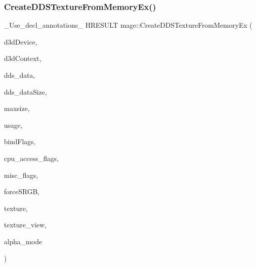 \subsubsection{\texorpdfstring{Create\+D\+D\+S\+Texture\+From\+Memory\+Ex()}{CreateDDSTextureFromMemoryEx()}\hspace{0.1cm}{\footnotesize\ttfamily [4/4]}}
{\footnotesize\ttfamily \+\_\+\+Use\+\_\+decl\+\_\+annotations\+\_\+ H\+R\+E\+S\+U\+LT mage\+::\+Create\+D\+D\+S\+Texture\+From\+Memory\+Ex (\begin{DoxyParamCaption}\item[{I\+D3\+D11\+Device $\ast$}]{d3d\+Device,  }\item[{I\+D3\+D11\+Device\+Context $\ast$}]{d3d\+Context,  }\item[{const uint8\+\_\+t $\ast$}]{dds\+\_\+data,  }\item[{size\+\_\+t}]{dds\+\_\+data\+Size,  }\item[{size\+\_\+t}]{maxsize,  }\item[{D3\+D11\+\_\+\+U\+S\+A\+GE}]{usage,  }\item[{uint32\+\_\+t}]{bind\+Flags,  }\item[{uint32\+\_\+t}]{cpu\+\_\+access\+\_\+flags,  }\item[{uint32\+\_\+t}]{misc\+\_\+flags,  }\item[{bool}]{force\+S\+R\+GB,  }\item[{I\+D3\+D11\+Resource $\ast$$\ast$}]{texture,  }\item[{I\+D3\+D11\+Shader\+Resource\+View $\ast$$\ast$}]{texture\+\_\+view,  }\item[{\hyperlink{namespacemage_a0c586a2bad862f4858900ca121ca80c2}{D\+D\+S\+\_\+\+A\+L\+P\+H\+A\+\_\+\+M\+O\+DE} $\ast$}]{alpha\+\_\+mode }\end{DoxyParamCaption})}

\hypertarget{namespacemage_a1abae840c6e112b20872c3c0bb2a6442}{}\label{namespacemage_a1abae840c6e112b20872c3c0bb2a6442} 
